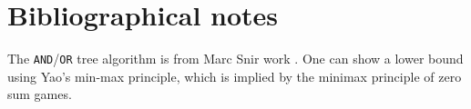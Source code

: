 



\section{Bibliographical notes}

The \texttt{AND}/\texttt{OR} tree algorithm is from Marc Snir work
\cite{s-lbpld-85}. One can show a lower bound using Yao's min-max
principle, which is implied by the minimax principle of zero sum
games.


\ChapterEnd{}
%  
%

%
